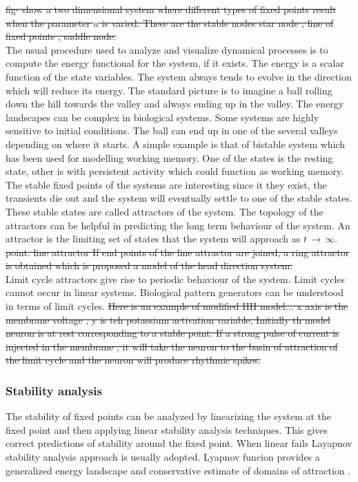 \st{fig- show a two dimensional system where different types of fixed points result when the parameter $a$ is varied. These are the stable nodes star node , line of fixed points , saddle node. \\
}
The usual procedure used to analyze and visualize dynamical processes is to compute the energy functional for the system, if it exists. The energy is a scalar function of the state variables. The system always tends to evolve in the direction which will reduce its energy. The standard picture is to imagine a ball rolling down the hill towards the valley and always ending up in the valley. The energy landscapes can be complex in biological systems. Some systems are highly sensitive to initial conditions. The ball can end up in one of the several valleys depending on where it starts. A simple example is that of bistable system which has been used for modelling working memory. One of the states is the resting state, other is with persistent activity which could function as working memory.\\
The stable fixed points of the systems are interesting since it they exist, the transients die out and the system will eventually settle to one of the stable states. These stable states are called attractors of the system. The topology of the attractors can be helpful in predicting the long term behaviour of the system. An attractor is the limiting set of states that the system will approach as $t\, \rightarrow \, \infty $.\\
\st{point. line attractor If end points of the line attractor are joined, a ring attractor is obtained which is proposed a model of the head direction system.} \\
Limit cycle attractors give rise to periodic behaviour of the system. Limit cycles cannot occur in linear systems. Biological pattern generators can be understood in terms of limit cycles. \st{Here is an example of modified HH model... x axis is the membrane voltage , y is teh potassium activation variable, Initially th model neuron is at rest corresponding to a stable point. If a strong pulse of current is injected in the membrane , it will take the neuron to the basin of attraction of the limit cycle and the neuron will produce rhythmic spikes.} \\


\subsubsection{Stability analysis}
The stability of fixed points can be analyzed by linearizing the system at the fixed point and then applying linear stability analysis techniques. This gives correct predictions of stability around the fixed point. When linear fails Layapnov stability analysis approach is usually adopted. Lyapnov funcion provides a generalized energy landscape and conservative estimate of domains of attraction . 
\\
